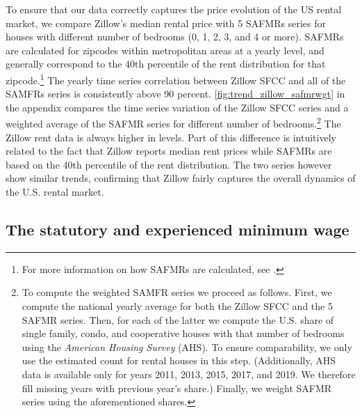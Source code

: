 To ensure that our data correctly captures the price evolution of the US rental market, 
we compare Zillow's median rental price with 5 SAFMRs series for houses with different 
number of bedrooms (0, 1, 2, 3, and 4 or more). SAFMRs are calculated for zipcodes within 
metropolitan areas at a yearly level, and generally correspond to the 40th percentile of 
the rent distribution for that zipcode.\footnote{For more information on how SAFMRs are 
	calculated, see \textcite[][page 41641]{hudPreamble}.} 
The yearly time series correlation between Zillow SFCC and all of the SAMFRs series is 
consistently above 90 percent. \autoref{fig:trend_zillow_safmrwgt} in the appendix 
compares the time series variation of the Zillow SFCC series and a weighted average of 
the SAFMR series for different number of bedrooms.\footnote{
	\label{foot:zillow_time_series}
	To compute the weighted SAMFR series we proceed as follows. First, we compute the 
	national yearly average for both the Zillow SFCC and the 5 	SAFMR series. Then, for 
	each of the latter we compute the U.S. share of single family, condo, and cooperative 
	houses with that number of bedrooms using the \textit{American Housing Survey} (AHS). 
	To ensure comparability, we only use the estimated count for rental houses in this 
	step. (Additionally, AHS data is available only for years 2011, 2013, 2015, 2017, and 
	2019. We therefore fill missing years with previous year's share.) Finally, we weight 
	SAFMR series using the aforementioned shares.} 
The Zillow rent data is always higher in levels. Part of this difference is intuitively 
related to the fact that Zillow reports median rent prices while SAFMRs are based on the 
40th percentile of the rent distribution. The two series however show similar trends, 
confirming that Zillow fairly captures the overall dynamics of the U.S. rental 
market.

\subsection{The statutory and experienced minimum wage}\label{sec:mw_construction}

